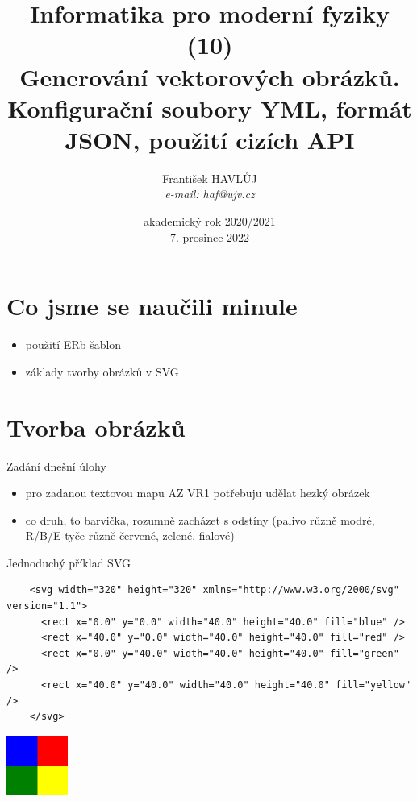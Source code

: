 \documentclass{beamer}
\title[IMF (10)]{Informatika pro moderní fyziky (10)\\ Generování vektorových obrázků. Konfigurační soubory YML, formát JSON, použití cizích API}
\author[Franti\v{s}ek HAVL\r{U}J, ORF ÚJV Řež]{Franti\v{s}ek HAVL\r{U}J\\{\scriptsize \emph{e-mail: haf@ujv.cz}}}
\date{akademický rok 2020/2021\\7. prosince 2022}
\institute[ORF ÚJV Řež]
{ÚJV Řež\\oddělení Reaktorové fyziky a podpory palivového cyklu}
\begin{document}
\begin{frame}
  \titlepage
\end{frame}

\begin{frame}
  \tableofcontents
\end{frame}

\section{Co jsme se naučili minule}

\begin{frame}{}
  \begin{itemize}
    \item použití ERb šablon
    \item základy tvorby obrázků v SVG
  \end{itemize}
\end{frame}

\section{Tvorba obrázků}

\begin{frame}{Zadání dnešní úlohy}
  \begin{itemize}
    \item pro zadanou textovou mapu AZ VR1 potřebuju udělat hezký obrázek
    \item co druh, to barvička, rozumně zacházet s odstíny (palivo různě modré, R/B/E tyče různě červené, zelené, fialové)
  \end{itemize}
\end{frame}

\begin{frame}[fragile]{Jednoduchý příklad SVG}
  \tiny
  \begin{verbatim}
    <svg width="320" height="320" xmlns="http://www.w3.org/2000/svg" version="1.1">
      <rect x="0.0" y="0.0" width="40.0" height="40.0" fill="blue" />
      <rect x="40.0" y="0.0" width="40.0" height="40.0" fill="red" />
      <rect x="0.0" y="40.0" width="40.0" height="40.0" fill="green" />
      <rect x="40.0" y="40.0" width="40.0" height="40.0" fill="yellow" />
    </svg>
  \end{verbatim}
  \includegraphics[width=0.15\textwidth]{example}
\end{frame}
\end{document}
